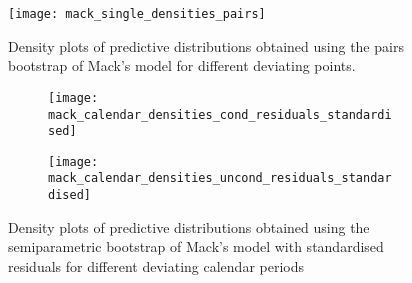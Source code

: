 \documentclass[a4paper]{book}
\begin{document}
\begin{landscape}
  \setlength\tabcolsep{4pt}
  \renewcommand{\arraystretch}{1.2}
  
\end{landscape}

\begin{landscape}
  \begin{figure}
    \centering
    \texttt{[image: mack\_single\_densities\_pairs]}
    \caption{Density plots of predictive distributions obtained using the pairs bootstrap of Mack's model for different deviating points.}
    \label{fig:mack-single-pairs}
  \end{figure}
\end{landscape}

\begin{landscape}
  \setlength\tabcolsep{2pt}
  \renewcommand{\arraystretch}{1.2}
  
\end{landscape}

\begin{landscape}
  \begin{figure}
    \begin{subfigure}{0.5\linewidth}
      \centering
      \texttt{[image: mack\_calendar\_densities\_cond\_residuals\_standardised]}
      \label{fig:mack-calendar-cond-semiparam-standard}
    \end{subfigure}
    \begin{subfigure}{0.5\linewidth}
      \centering
      \texttt{[image: mack\_calendar\_densities\_uncond\_residuals\_standardised]}
      \label{fig:mack-calendar-uncond-semiparam-standard}
    \end{subfigure}
    \caption{Density plots of predictive distributions obtained using the semiparametric bootstrap of Mack's model with standardised residuals for different deviating calendar periods}
  \end{figure}
\end{landscape}
\end{document}
